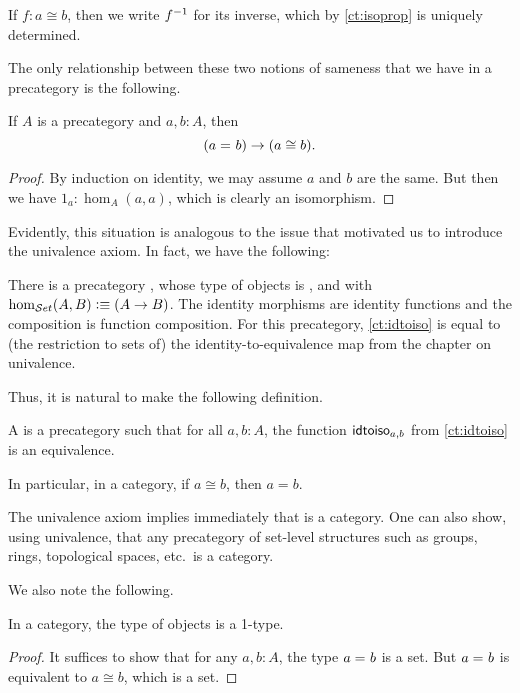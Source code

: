If $f:a\cong b$, then we write ${f}^{-1}$ for its inverse, which by \autoref{ct:isoprop} is uniquely determined.

The only relationship between these two notions of sameness that we have in a precategory is the following.

\begin{lem}\label{ct:idtoiso}
  If $A$ is a precategory and $a,b:A$, then
  \[(a =_{} b)\to (a \cong b).\]
\end{lem}
\begin{proof}
  By induction on identity, we may assume $a$ and $b$ are the same.
  But then we have $1_a:\hom_A(a,a)$, which is clearly an isomorphism.
\end{proof}

Evidently, this situation is analogous to the issue that motivated us to introduce the univalence axiom.
In fact, we have the following:

\begin{eg}\label{ct:precatset}
  There is a precategory \uset, whose type of objects is \set, and with $\hom_{\mathcal{S}et}(A,B) \vcentcolon\equiv (A\to B)$.
  The identity morphisms are identity functions and the composition is function composition.
  For this precategory, \autoref{ct:idtoiso} is equal to (the restriction to sets of) the identity-to-equivalence map from the chapter on univalence.
\end{eg}

Thus, it is natural to make the following definition.

\begin{defn}\label{ct:category}
  A  is a precategory such that for all $a,b:A$, the function $\mathsf{idtoiso}_{a,b}$ from \autoref{ct:idtoiso} is an equivalence.
\end{defn}

In particular, in a category, if $a\cong b$, then $a=b$.

\begin{eg}\label{ct:eg:set}
  The univalence axiom implies immediately that \uset is a category.
  One can also show, using univalence, that any precategory of set-level structures such as groups, rings, topological spaces, etc.\ is a category.
\end{eg}

We also note the following.

\begin{lem}\label{ct:obj-1type}
  In a category, the type of objects is a 1-type.
\end{lem}
\begin{proof}
  It suffices to show that for any $a,b:A$, the type $a =_{} b$ is a set.
  But $a =_{} b$ is equivalent to $a \cong b$, which is a set.
\end{proof}


